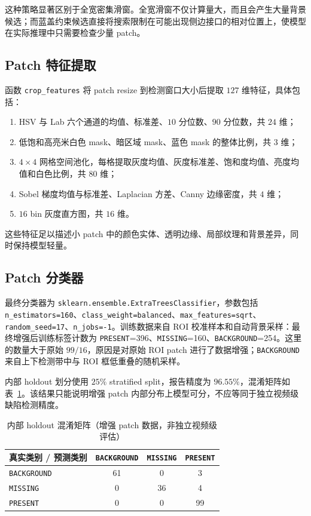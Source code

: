 \documentclass[a4paper,12pt]{article}
\newcommand{\code}[1]{\texttt{#1}}
\begin{document}
这种策略显著区别于全宽密集滑窗。全宽滑窗不仅计算量大，而且会产生大量背景候选；而蓝盖约束候选直接将搜索限制在可能出现侧边接口的相对位置上，使模型在实际推理中只需要检查少量 patch。

\subsection{Patch 特征提取}
函数 \code{crop\_features} 将 patch resize 到检测窗口大小后提取 $127$ 维特征，具体包括：
\begin{enumerate}[label=\arabic*.]
    \item HSV 与 Lab 六个通道的均值、标准差、$10$ 分位数、$90$ 分位数，共 $24$ 维；
    \item 低饱和高亮米白色 mask、暗区域 mask、蓝色 mask 的整体比例，共 $3$ 维；
    \item $4\times4$ 网格空间池化，每格提取灰度均值、灰度标准差、饱和度均值、亮度均值和白色比例，共 $80$ 维；
    \item Sobel 梯度均值与标准差、Laplacian 方差、Canny 边缘密度，共 $4$ 维；
    \item $16$ bin 灰度直方图，共 $16$ 维。
\end{enumerate}
这些特征足以描述小 patch 中的颜色实体、透明边缘、局部纹理和背景差异，同时保持模型轻量。

\subsection{Patch 分类器}
最终分类器为 \code{sklearn.ensemble.ExtraTreesClassifier}，参数包括 \code{n\_estimators=160}、\code{class\_weight=balanced}、\code{max\_features=sqrt}、\code{random\_seed=17}、\code{n\_jobs=-1}。训练数据来自 ROI 校准样本和自动背景采样：最终增强后训练标签计数为 \code{PRESENT}=396、\code{MISSING}=160、\code{BACKGROUND}=254。这里的数量大于原始 $99/16$，原因是对原始 ROI patch 进行了数据增强；\code{BACKGROUND} 来自上下检测带中与 ROI 框低重叠的随机采样。

内部 holdout 划分使用 $25\%$ stratified split，报告精度为 $96.55\%$，混淆矩阵如表~\ref{tab:holdout-confusion}。该结果只能说明增强 patch 内部分布上模型可分，不应等同于独立视频级缺陷检测精度。

\begin{table}[H]
\centering
\caption{内部 holdout 混淆矩阵（增强 patch 数据，非独立视频级评估）}
\label{tab:holdout-confusion}
\small
\begin{tabular}{lccc}
\toprule
真实类别 / 预测类别 & \code{BACKGROUND} & \code{MISSING} & \code{PRESENT} \\
\midrule
\code{BACKGROUND} & 61 & 0 & 3 \\
\code{MISSING} & 0 & 36 & 4 \\
\code{PRESENT} & 0 & 0 & 99 \\
\bottomrule
\end{tabular}
\end{table}
\end{document}
